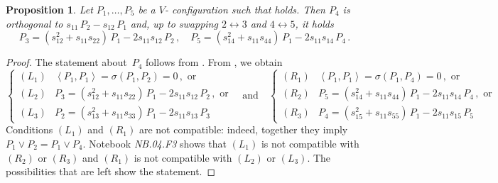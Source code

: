 \documentclass[a4paper, 11pt, reqno]{amsart}
\theoremstyle{plain}
\newtheorem{prop}[lemma]{Proposition}
\theoremstyle{definition}
\newcommand{\nb}[2]{\textsl{{NB}.{#1}.{#2}}}
\begin{document}
\begin{prop}
\label{prop:char_rank_8}
  Let $P_1, \dotsc, P_5$ be a $V$- configuration such that  holds.
  Then $P_4$ is orthogonal to $s_{11} \, P_2 - s_{12} \, P_1$ and, up to swapping $2 \leftrightarrow 3$ and $4 \leftrightarrow 5$, it holds
  \[
   P_3 = (s_{12}^2+s_{11}s_{22}) \, P_1 - 2s_{11}s_{12} \, P_2 \,, \quad
   P_5 = (s_{14}^2+s_{11}s_{44}) \, P_1 - 2s_{11}s_{14} \, P_4 \,.
  \]
\end{prop}
\begin{proof}
  The statement about~$P_4$ follows from . 
  From , we obtain
  \[
  \left\{
  \begin{array}{ll}
  (L_1) & \left\langle P_1, P_1 \right\rangle = \sigma(P_1, P_2) = 0 \,, \text{ or} \\
  (L_2) & P_3 = (s_{12}^2+s_{11}s_{22}) \, P_1 - 2s_{11}s_{12} \, P_2 \,, \text{ or} \\
  (L_3) & P_2 = (s_{13}^2+s_{11}s_{33}) \, P_1 - 2s_{11}s_{13} \, P_3
  \end{array}
  \right.
  \quad \text{and} \quad
  \left\{
  \begin{array}{ll}
  (R_1) & \left\langle P_1, P_1 \right\rangle = \sigma(P_1, P_4) = 0 \,, \text{ or} \\
  (R_2) & P_5 = (s_{14}^2+s_{11}s_{44}) \, P_1 - 2s_{11}s_{14} \, P_4 \,, \text{ or} \\
  (R_3) & P_4 = (s_{15}^2+s_{11}s_{55}) \, P_1 - 2s_{11}s_{15} \, P_5
  \end{array}
  \right.
  \]
  Conditions $(L_1)$ and $(R_1)$ are not compatible: indeed, together they imply $P_1 \vee P_2 = P_1 \vee P_4$. 
  Notebook \nb{04}{F3} shows that $(L_1)$ is not compatible with $(R_2)$ or $(R_3)$ and $(R_1)$ is not compatible with $(L_2)$ or $(L_3)$.
  The possibilities that are left show the statement.
\end{proof}
\end{document}

